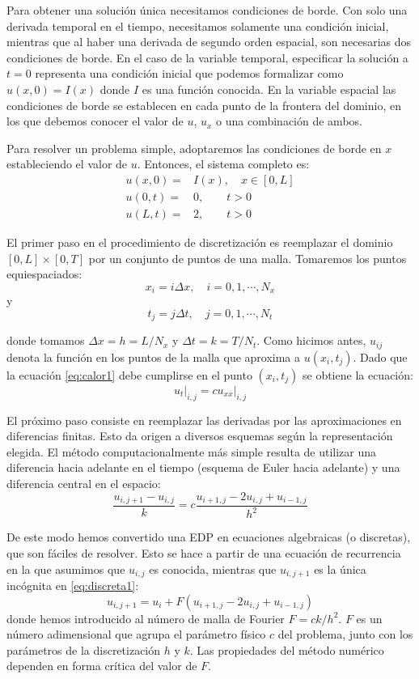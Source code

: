 Para obtener una solución única necesitamos condiciones de borde. Con solo una derivada temporal en el tiempo, necesitamos solamente una condición inicial, mientras que al haber una derivada de segundo orden espacial, son necesarias dos condiciones de borde. En el caso de la variable temporal, especificar la solución a $t=0$ representa una condición inicial que podemos formalizar como $u(x,0) = I(x)$ donde $I$ es una función conocida. En la variable espacial las condiciones de borde se establecen en cada punto de la frontera del dominio, en los que debemos conocer el valor de $u$, $u_x$ o una combinación de ambos.

Para resolver un problema simple, adoptaremos las condiciones de borde en $x$ estableciendo el valor de $u$. Entonces, el sistema completo es:
\begin{align} 
 u(x,0) =& I(x), \quad x \in [0, L] \label{eq:bordet0}\\
 u(0, t) =& 0, \qquad t > 0 \label{eq:bordex0}\\
 u(L, t) =& 2, \qquad t > 0 \label{eq:bordex1}
\end{align}

El primer paso en el procedimiento de discretización es reemplazar el dominio $[0, L] \times [0, T]$ por un conjunto de puntos de una malla. Tomaremos los puntos equiespaciados:
\[ x_i = i \Delta x, \quad i = 0, 1, \cdots, N_x \]
y
\[ t_j = j \Delta t, \quad j = 0, 1, \cdots, N_t \]

donde tomamos $\Delta x = h = L/N_x$ y $\Delta t = k = T/N_t$. Como hicimos antes, $u_{ij}$ denota la función en los puntos de la malla que aproxima a $u(x_i, t_j)$. Dado que la ecuación \eqref{eq:calor1} debe cumplirse en el punto $(x_i, t_j)$ se obtiene la ecuación:
\begin{equation}
 u_t \Bigr|_{i,j} = c u_{xx}\Bigr|_{i,j}
\end{equation} 

El próximo paso consiste en reemplazar las derivadas por las aproximaciones en diferencias finitas. Esto da origen a diversos esquemas según la representación elegida. El método computacionalmente más simple resulta de utilizar una diferencia hacia adelante en el tiempo (esquema de Euler hacia adelante) y una diferencia central en el espacio:
\begin{equation} \label{eq:discreta1}
 \frac{u_{i,j+1} - u_{i,j}}{k} = c \frac{u_{i+1,j} - 2 u_{i,j} + u_{i-1, j}}{h ^2}
\end{equation} 

De este modo hemos convertido una EDP en ecuaciones algebraicas (o discretas), que son fáciles de resolver. Esto se hace a partir de una ecuación de recurrencia en la que asumimos que $u_{i,j}$ es conocida, mientras que $u_{i, j+1}$ es la única incógnita en \eqref{eq:discreta1}:
\begin{equation} \label{eq:recurrencia1}
 u_{i, j+1} = u_i + F(u_{i+1,j} - 2 u_{i,j} + u_{i-1, j})
\end{equation} 
donde hemos introducido al número de malla de Fourier $F = ck/h^2$. $F$ es un número adimensional que agrupa el parámetro físico $c$ del problema, junto con los parámetros de la discretización $h$ y $k$. Las propiedades del método numérico dependen en forma crítica del valor de $F$.

